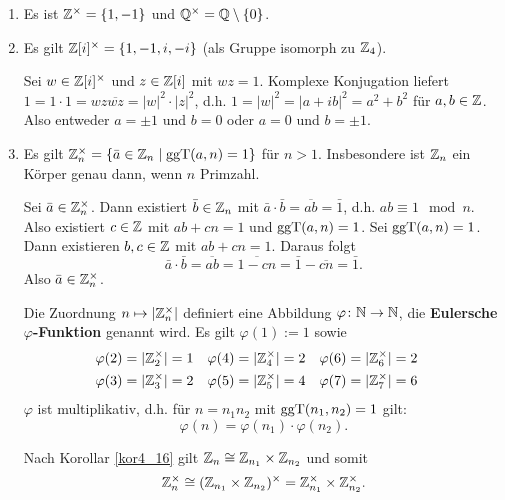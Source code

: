 \begin{beispiel}\label{beispiel5_3}
	\begin{enumerate}[label=(\arabic*)]
		\item Es ist $\mathbb{Z}^\times = \{1,-1\}$ und $\mathbb{Q}^\times = \mathbb{Q} \setminus \{0\}$.
		\item Es gilt $\mathbb{Z}[i]^\times = \{1,-1,i,-i\}$ (als Gruppe isomorph zu $\mathbb{Z}_4$).
		\begin{inlproof}
			Sei $w \in \mathbb{Z}[i]^\times$ und $z \in \mathbb{Z}[i]$ mit $wz = 1$. Komplexe Konjugation liefert $1 = 1\cdot 1 = wz \overline{wz} = |w|^2 \cdot |z|^2$, d.h. $1 = |w|^2 = |a + ib|^2 = a^2 + b^2$ für $a,b \in \mathbb{Z}$. Also entweder $a = \pm 1$ und $b = 0$ oder $a = 0$ und $b = \pm 1$.
		\end{inlproof}
		\item Es gilt $\mathbb{Z}_n^\times = \{\bar{a} \in \mathbb{Z}_n \mid \mathrm{ggT}(a,n) =1\}$ für $n > 1$. Insbesondere ist $\mathbb{Z}_n$ ein Körper genau dann, wenn $n$ Primzahl.
		\begin{inlproof}
			Sei $\bar{a} \in \mathbb{Z}_n^\times$. Dann existiert $\bar{b} \in \mathbb{Z}_n$ mit $\bar{a}\cdot\bar{b} = \overline{ab} = \bar{1}$, d.h. $ab \equiv 1 \mod n$. Also existiert $c \in \mathbb{Z}$ mit $ab + cn = 1$ und $\mathrm{ggT}(a,n) = 1$. Sei $\mathrm{ggT}(a,n) = 1$. Dann existieren $b,c \in \mathbb{Z}$ mit $ab + cn = 1$. Daraus folgt
			\[\bar{a}\cdot\bar{b} = \overline{ab} = \overline{1 -cn} = \bar{1} - \overline{cn} = \bar{1}.\]
			Also $\bar{a} \in \mathbb{Z}_n^\times$.
		\end{inlproof}
		Die Zuordnung $n \mapsto |\mathbb{Z}_n^\times|$ definiert eine Abbildung $\varphi \colon \mathbb{N}\to\mathbb{N}$, die \textbf{Eulersche $\varphi$-Funktion} genannt wird. Es gilt $\varphi(1) := 1$ sowie
		\begin{align*}
			&\varphi(2) = |\mathbb{Z}_2^\times| = 1& &\varphi(4) = |\mathbb{Z}_4^\times| = 2& &\varphi(6) = |\mathbb{Z}_6^\times| = 2&\\
			&\varphi(3) = |\mathbb{Z}_3^\times| = 2& &\varphi(5) = |\mathbb{Z}_5^\times| = 4& &\varphi(7) = |\mathbb{Z}_7^\times| = 6&
		\end{align*}
		$\varphi$ ist multiplikativ, d.h. für $n = n_1 n_2$ mit $\mathrm{ggT}(n_1, n_2) = 1$ gilt:
		\[\varphi(n) = \varphi(n_1) \cdot \varphi(n_2).\]
		\begin{inlproof}
			Nach Korollar \ref{kor4_16} gilt $\mathbb{Z}_n \cong \mathbb{Z}_{n_1} \times \mathbb{Z}_{n_2}$ und somit
			\[\mathbb{Z}_n^\times  \cong (\mathbb{Z}_{n_1} \times \mathbb{Z}_{n_2})^\times = \mathbb{Z}_{n_1}^\times \times \mathbb{Z}_{n_2}^\times.\]
		\end{inlproof}
	\end{enumerate}
\end{beispiel}

